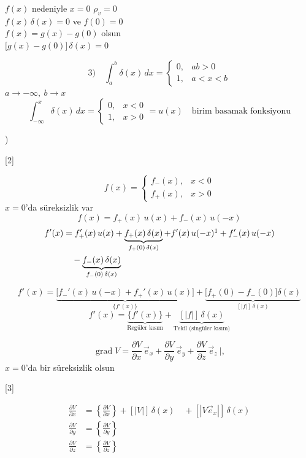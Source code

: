 \documentclass[11pt,a4paper]{article}
\begin{document}
\noindent $f(x)$ nedeniyle $x=0$ $\rho_v=0$\\
$f(x)\,\delta(x)=0$ ve $f(0)=0$\\
$f(x)=g(x)-g(0)$ olsun\\
$\bigl[g(x)-g(0)\bigr]\,\delta(x)=0$


\[
\text{3)}\quad\int_a^b\delta(x)\,dx=\begin{cases}0, & ab>0\\ 1, & a<x<b\end{cases}
\]
$a\to-\infty,\ b\to x$
\[
\int_{-\infty}^{x}\delta(x)\,dx=\begin{cases}0, & x<0\\ 1, & x>0\end{cases}=u(x)\quad\text{birim basamak fonksiyonu}
\]


)

[2]

\[
f(x)=\begin{cases}f_-(x), & x<0\\ f_+(x), & x>0\end{cases}
\]
$x=0$'da süreksizlik var
\[
f(x)=f_+(x)\,u(x)+f_-(x)\,u(-x)
\]
\begin{align*}
f'(x)&=f_+'(x)\,u(x)+\underbrace{f_+(x)\,\delta(x)}_{f_+(0)\,\delta(x)}+f'(x)\,u(-x)\footnotemark+f_-'(x)\,u(-x)\\
&\quad-\underbrace{f_-(x)\,\delta(x)}_{f_-(0)\,\delta(x)}
\end{align*}

\[
f'(x)=\underbrace{\Big[f_-'(x)\,u(-x)+f_+'(x)\,u(x)\Big]}_{\{f'(x)\}}+\underbrace{\Big[f_+(0)-f_-(0)\Big]\delta(x)}_{[|f|]\,\delta(x)}
\]
\[
f'(x)=\underbrace{\{f'(x)\}}_{\text{Regüler kısım}}+\underbrace{[|f|]\,\delta(x)}_{\text{Tekil (singüler kısım)}}
\]

\[
\operatorname{grad}V=\frac{\partial V}{\partial x}\,\vec e_x+\frac{\partial V}{\partial y}\,\vec e_y+\frac{\partial V}{\partial z}\,\vec e_z\ \Big|,
\]
\noindent $x=0$'da bir süreksizlik olsun

[3]

\begin{align*}
\frac{\partial V}{\partial x}&=\left\{\frac{\partial V}{\partial x}\right\}+[|V|]\,\delta(x)\quad+[|V\vec e_x|]\,\delta(x)\\
\frac{\partial V}{\partial y}&=\left\{\frac{\partial V}{\partial y}\right\}\\
\frac{\partial V}{\partial z}&=\left\{\frac{\partial V}{\partial z}\right\}
\end{align*}
\end{document}
